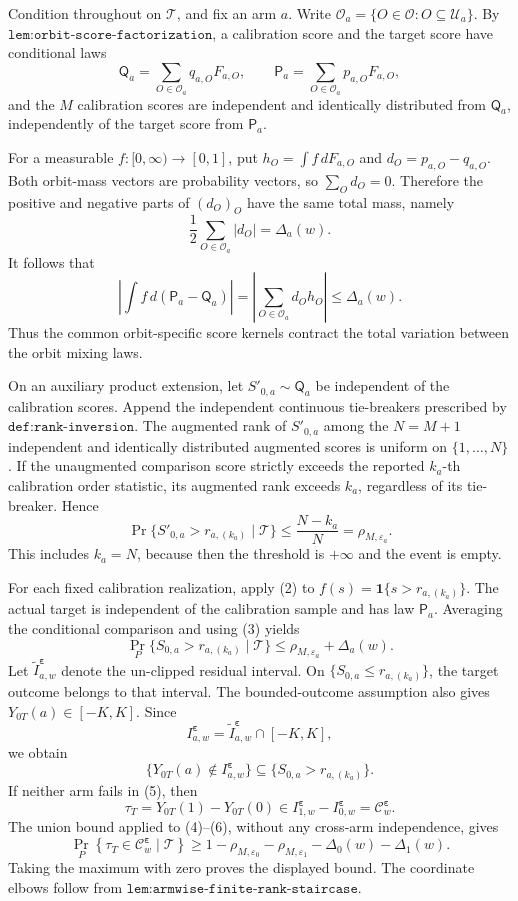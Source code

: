 Condition throughout on \(\mathcal T\), and fix an arm \(a\). Write \(\mathcal O_a=\{O\in\mathcal O:O\subseteq\mathcal U_a\}\). By \(\texttt{lem:orbit-score-factorization}\), a calibration score and the target score have conditional laws
\[
\mathsf Q_a=\sum_{O\in\mathcal O_a}q_{a,O}F_{a,O},\qquad \mathsf P_a=\sum_{O\in\mathcal O_a}p_{a,O}F_{a,O},
\tag{1}
\]
and the \(M\) calibration scores are independent and identically distributed from \(\mathsf Q_a\), independently of the target score from \(\mathsf P_a\).

For a measurable \(f:[0,\infty)\to[0,1]\), put \(h_O=\int f\,dF_{a,O}\) and \(d_O=p_{a,O}-q_{a,O}\). Both orbit-mass vectors are probability vectors, so \(\sum_Od_O=0\). Therefore the positive and negative parts of \((d_O)_O\) have the same total mass, namely
\[
\frac12\sum_{O\in\mathcal O_a}|d_O|=\Delta_a(w).
\]
It follows that
\[
\left|\int f\,d(\mathsf P_a-\mathsf Q_a)\right|=\left|\sum_{O\in\mathcal O_a}d_Oh_O\right|\le \Delta_a(w).
\tag{2}
\]
Thus the common orbit-specific score kernels contract the total variation between the orbit mixing laws.

On an auxiliary product extension, let \(S'_{0,a}\sim\mathsf Q_a\) be independent of the calibration scores. Append the independent continuous tie-breakers prescribed by \(\texttt{def:rank-inversion}\). The augmented rank of \(S'_{0,a}\) among the \(N=M+1\) independent and identically distributed augmented scores is uniform on \(\{1,\ldots,N\}\). If the unaugmented comparison score strictly exceeds the reported \(k_a\)-th calibration order statistic, its augmented rank exceeds \(k_a\), regardless of its tie-breaker. Hence
\[
\Pr\{S'_{0,a}>r_{a,(k_a)}\mid\mathcal T\}\le\frac{N-k_a}{N}=\rho_{M,\varepsilon_a}.
\tag{3}
\]
This includes \(k_a=N\), because then the threshold is \(+\infty\) and the event is empty.

For each fixed calibration realization, apply (2) to \(f(s)=\mathbf 1\{s>r_{a,(k_a)}\}\). The actual target is independent of the calibration sample and has law \(\mathsf P_a\). Averaging the conditional comparison and using (3) yields
\[
\Pr_P\{S_{0,a}>r_{a,(k_a)}\mid\mathcal T\}\le \rho_{M,\varepsilon_a}+\Delta_a(w).
\tag{4}
\]
Let \(\widetilde I^{\boldsymbol\varepsilon}_{a,w}\) denote the un-clipped residual interval. On \(\{S_{0,a}\le r_{a,(k_a)}\}\), the target outcome belongs to that interval. The bounded-outcome assumption also gives \(Y_{0T}(a)\in[-K,K]\). Since
\[
I^{\boldsymbol\varepsilon}_{a,w}=\widetilde I^{\boldsymbol\varepsilon}_{a,w}\cap[-K,K],
\]
we obtain
\[
\{Y_{0T}(a)\notin I^{\boldsymbol\varepsilon}_{a,w}\}\subseteq\{S_{0,a}>r_{a,(k_a)}\}.
\tag{5}
\]
If neither arm fails in (5), then
\[
\tau_T=Y_{0T}(1)-Y_{0T}(0)\in I^{\boldsymbol\varepsilon}_{1,w}-I^{\boldsymbol\varepsilon}_{0,w}=\mathcal C^{\boldsymbol\varepsilon}_w.
\tag{6}
\]
The union bound applied to (4)--(6), without any cross-arm independence, gives
\[
\Pr_P\!\left\{\tau_T\in\mathcal C^{\boldsymbol\varepsilon}_w\mid\mathcal T\right\}\ge 1-\rho_{M,\varepsilon_0}-\rho_{M,\varepsilon_1}-\Delta_0(w)-\Delta_1(w).
\]
Taking the maximum with zero proves the displayed bound. The coordinate elbows follow from \(\texttt{lem:armwise-finite-rank-staircase}\).

